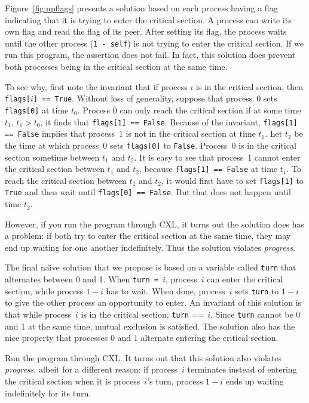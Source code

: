 \documentclass{report}
\begin{document}
Figure~\ref{fig:upflags} presents a solution based on each process having
a flag indicating that it is trying to enter the critical section.
A process can write its own flag and read the flag of its peer.
After setting its flag, the process waits until the other process
(\texttt{1 - self}) is not trying to enter the critical section.
If we run this program, the assertion does not fail.  In fact, this
solution does prevent both processes being in the critical section at
the same time.

To see why, first note the invariant that if process $i$ is in the
critical section, then \texttt{flags[$i$] == True}.
Without loss of generality,
suppose that process~0 sets \texttt{flags[0]} at time $t_0$.
Process 0 can only reach the critical section if at some time $t_1$,
$t_1 > t_0$, it finds that \texttt{flags[1] == False}.
Because of the invariant, \texttt{flags[1] == False} implies that
process~1 is not in the critical section at time $t_1$.
Let $t_2$ be the time at which process~0 sets \texttt{flags[0]}
to \texttt{False}.  Process~0 is in the critical section sometime
between $t_1$ and $t_2$.
It is easy to see that process~1 cannot enter the critical section
between $t_1$ and $t_2$, because \texttt{flags[1] == False} at
time $t_1$.  To reach the critical section between $t_1$ and $t_2$,
it would first have to set \texttt{flags[1]} to \texttt{True} and
then wait until \texttt{flags[0] == False}.  But that does not happen
until time $t_2$.

However, if you run the program through CXL, it turns out the solution
does has a problem: if both try to enter the critical section at the same
time, they may end up waiting for one another indefinitely.  Thus the
solution violates \emph{progress}.

The final na\"{\i}ve solution that we propose
is based on a variable called \texttt{turn}
that alternates between 0 and 1.  When \texttt{turn = $i$}, process~$i$ can
enter the critical section, while process $1-i$ has to wait.  When done,
process~$i$ sets \texttt{turn} to $1-i$ to give the other process an
opportunity to enter.
An invariant of this solution is that while process~$i$ is in the critical
section, \texttt{turn} == $i$.
Since \texttt{turn} cannot be 0 and 1 at
the same time, mutual exclusion is satisfied.
The solution also has the nice property that
processes 0 and 1 alternate entering the critical section.

Run the program through CXL.  It turns out that this solution also violates
\emph{progress}, albeit for a different reason:
if process~$i$ terminates instead of entering the critical section when it
is process~$i$'s turn, process $1-i$ ends up waiting indefinitely for its
turn.
\end{document}
